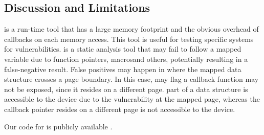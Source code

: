 \subsection{Discussion and Limitations}
\dkasan is a run-time tool that has a large memory footprint and the obvious overhead of callbacks on each memory access. This tool is useful for testing specific systems for vulnerabilities.
\tool is a static analysis tool that may fail to follow a mapped variable due to \DIFdelbegin {}\DIFdelend \DIFaddbegin {}\DIFaddend function pointers, macros\DIFaddbegin \DIFadd{, }\DIFaddend and others, potentially resulting in a false-negative result. False positives may happen in \DIFdelbegin {}\DIFdelend \DIFaddbegin {}\DIFaddend %
where the mapped data structure crosses a  page boundary. In this case, \tool may flag a callback function \DIFdelbegin {}\DIFdelend \DIFaddbegin {}\DIFaddend may not be exposed, since it resides on a different page. \DIFdelbegin {}\DIFdelend \DIFaddbegin {}\DIFaddend part of a data structure is accessible to the device due to the \subpage{} vulnerability at the mapped page, whereas the callback pointer resides on a different page \DIFdelbegin {}\DIFdelend \DIFaddbegin {}\DIFaddend is not accessible to the device.%

Our code for \dkasan is publicly available \cite{DKASAN}.